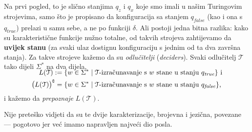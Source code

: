Na prvi pogled, to je slično stanjima $q_z$ i $q_x$ koje smo imali u našim Turingovim strojevima, samo što je propisano da konfiguracija sa stanjem $q_{\mathit{false}}$ (kao i ona s $q_{\mathit{true}}$) prelazi u samu sebe, a ne po funkciji $\delta$. Ali postoji jedna bitna razlika: kako su karakteristične funkcije nužno totalne, od takvih strojeva zahtijevamo da \textbf{uvijek stanu} (za svaki ulaz dostignu konfiguraciju s jednim od ta dva završna stanja). Za takve strojeve kažemo da su \emph{odlučitelji} (\emph{deciders}). Svaki odlučitelj $\mathcal T$ tako dijeli $\Sigma^*$ na dva dijela,
\begin{align}
    \SwapAboveDisplaySkip
    L(\mathcal T):=\{w\in\Sigma^*&\mid\text{$\mathcal T$-izračunavanje s $w$ stane u stanju $q_{\mathit{true}}$}\}
    \text{ i}\\ \bigl(L(\mathcal T)\big)\kompl=\{w\in\Sigma^*&\mid\text{$\mathcal T$-izračunavanje s $w$ stane u stanju $q_{\mathit{false}}$}\}\text,
\end{align} i kažemo da \emph{prepoznaje} $L(\mathcal T)$.

Nije preteško vidjeti da su te dvije karakterizacije, brojevna i jezična, povezane --- pogotovo jer već imamo napravljen najveći dio posla.

